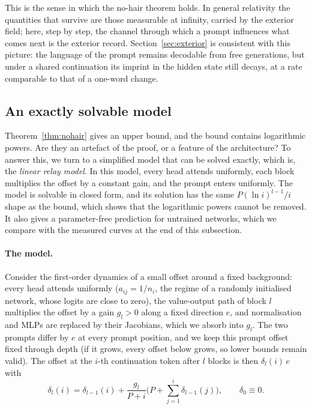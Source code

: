 \documentclass[11pt]{article}
\theoremstyle{definition}
\theoremstyle{remark}
\begin{document}
This is the sense in which the no-hair theorem holds. In general relativity the quantities that survive are those measurable at infinity, carried by the exterior field; here, step by step, the channel through which a prompt influences what comes next is the exterior record. Section~\ref{sec:exterior} is consistent with this picture: the language of the prompt remains decodable from free generations, but under a shared continuation its imprint in the hidden state still decays, at a rate comparable to that of a one-word change.

\subsection{An exactly solvable model}
\label{sec:theory-linear}

Theorem~\ref{thm:nohair} gives an upper bound, and the bound contains logarithmic powers. Are they an artefact of the proof, or a feature of the architecture? To answer this, we turn to a simplified model that can be solved exactly,  which is, the \emph{linear relay model}. In this model,  every head attends uniformly, each block multiplies the offset by a constant gain, and the prompt enters uniformly. The model is solvable in closed form, and its solution has the same $P(\ln i)^{l-1}/i$ shape as the bound, which shows that the logarithmic powers cannot be removed. It also gives a parameter-free prediction for untrained networks, which we compare with the measured curves at the end of this subsection.

\paragraph{The model.} Consider the first-order dynamics of a small offset around a fixed background: every head attends uniformly ($a_{ij}=1/n_i$, the regime of a randomly initialised network, whose logits are close to zero), the value-output path of block $l$ multiplies the offset by a gain $g_l>0$ along a fixed direction $e$, and normalisation and MLPs are replaced by their Jacobians, which we absorb into $g_l$. The two prompts differ by $e$ at every prompt position, and we keep this prompt offset fixed through depth (if it grows, every offset below grows, so lower bounds remain valid). The offset at the $i$-th continuation token after $l$ blocks is then $\delta_l(i)\,e$ with
\begin{equation}\label{eq:linrelay}
  \delta_l(i)=\delta_{l-1}(i)+\frac{g_l}{P+i}\Big(P+\sum_{j=1}^{i}\delta_{l-1}(j)\Big),\qquad\delta_0\equiv0 .
\end{equation}
\end{document}
